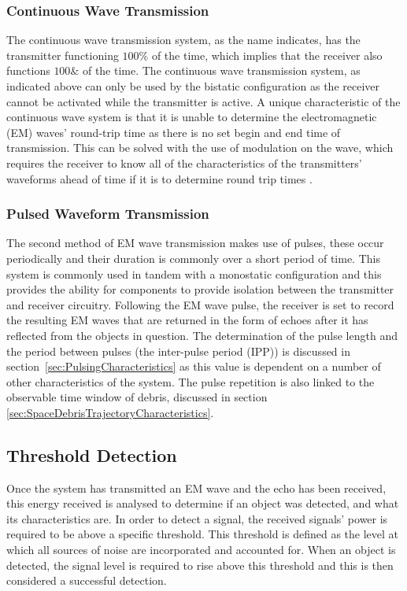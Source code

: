 \documentclass[11pt]{witseiepaper}
\begin{document}
\subsubsection{Continuous Wave Transmission} \label{sec:ContinuousWaveTransmission}

The continuous wave transmission system, as the name indicates, has the transmitter functioning $100\%$ of the time, which implies that the receiver also functions $100 \&$ of the time. The continuous wave transmission system, as indicated above can only be used by the bistatic configuration as the receiver cannot be activated while the transmitter is active.
A unique characteristic of the continuous wave system is that it is unable to determine the electromagnetic (EM) waves' round-trip time as there is no set begin and end time of transmission. This can be solved with the use of modulation on the wave, which requires the receiver to know all of the characteristics of the transmitters' waveforms ahead of time if it is to determine round trip times \cite[p.~20]{radarHandbook}.

\subsubsection{Pulsed Waveform Transmission} \label{sec:PulsedWaveformTransmission}

The second method of EM wave transmission makes use of pulses, these occur periodically and their duration is commonly over a short period of time. This system is commonly used in tandem with a monostatic configuration and this provides the ability for components to provide isolation between the transmitter and receiver circuitry.
Following the EM wave pulse, the receiver is set to record the resulting EM waves that are returned in the form of echoes after it has reflected from the objects in question. The determination of the pulse length and the period between pulses (the inter-pulse period (IPP)) is discussed in section~\ref{sec:PulsingCharacteristics} as this value is dependent on a number of other characteristics of the system. The pulse repetition is also linked to the observable time window of debris, discussed in section \ref{sec:SpaceDebrisTrajectoryCharacteristics}.


\subsection{Threshold Detection} \label{sec:ThresholdDetection}
Once the system has transmitted an EM wave and the echo has been received, this energy received is analysed to determine if an object was detected, and what its characteristics are.
In order to detect a signal, the received signals' power is required to be above a specific threshold. This threshold is defined as the level at which all sources of noise are incorporated and accounted for. When an object is detected, the signal level is required to rise above this threshold and this is then considered a successful detection.
\end{document}
